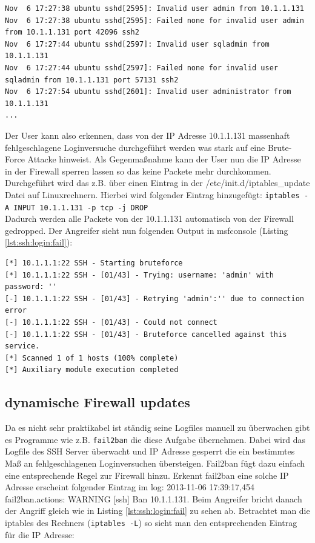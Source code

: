 \documentclass[a4paper,12pt]{article} %
\begin{document}
\begin{lstlisting}[style=code,caption={Auth-Log des SSH Server am Ziel},label=lst:ssh:log]
Nov  6 17:27:38 ubuntu sshd[2595]: Invalid user admin from 10.1.1.131
Nov  6 17:27:38 ubuntu sshd[2595]: Failed none for invalid user admin from 10.1.1.131 port 42096 ssh2
Nov  6 17:27:44 ubuntu sshd[2597]: Invalid user sqladmin from 10.1.1.131
Nov  6 17:27:44 ubuntu sshd[2597]: Failed none for invalid user sqladmin from 10.1.1.131 port 57131 ssh2
Nov  6 17:27:54 ubuntu sshd[2601]: Invalid user administrator from 10.1.1.131
...
\end{lstlisting}
Der User kann also erkennen, dass von der IP Adresse 10.1.1.131 massenhaft fehlgeschlagene Loginversuche durchgeführt werden was stark auf eine Brute-Force Attacke hinweist. Als Gegenmaßnahme kann der User nun die IP Adresse in der Firewall sperren lassen so das keine Packete mehr durchkommen. Durchgeführt wird das z.B. über einen Eintrag in der /etc/init.d/iptables\_update Datei auf Linuxrechnern. Hierbei wird folgender Eintrag hinzugefügt: \verb!iptables -A INPUT 10.1.1.131 -p tcp -j DROP! \\
Dadurch werden alle Packete von der 10.1.1.131 automatisch von der Firewall gedropped. Der Angreifer sieht nun folgenden Output in msfconsole (Listing \ref{lst:ssh:login:fail}):
\begin{lstlisting}[style=code,caption={Fehlgeschlagene Brute-Force Attacke},label=lst:ssh:login:fail]
[*] 10.1.1.1:22 SSH - Starting bruteforce
[*] 10.1.1.1:22 SSH - [01/43] - Trying: username: 'admin' with password: ''
[-] 10.1.1.1:22 SSH - [01/43] - Retrying 'admin':'' due to connection error
[-] 10.1.1.1:22 SSH - [01/43] - Could not connect
[-] 10.1.1.1:22 SSH - [01/43] - Bruteforce cancelled against this service.
[*] Scanned 1 of 1 hosts (100% complete)
[*] Auxiliary module execution completed
\end{lstlisting}

\subsection{dynamische Firewall updates}
\label{subsection:dyn:firewall}
Da es nicht sehr praktikabel ist ständig seine Logfiles manuell zu überwachen gibt es Programme wie z.B. \verb!fail2ban! die diese Aufgabe übernehmen. Dabei wird das Logfile des SSH Server überwacht und IP Adresse gesperrt die ein bestimmtes Maß an fehlgeschlagenen Loginversuchen übersteigen. Fail2ban fügt dazu einfach eine entsprechende Regel zur Firewall hinzu. Erkennt fail2ban eine solche IP Adresse erscheint folgender Eintrag im log: 2013-11-06 17:39:17,454 fail2ban.actions: WARNING [ssh] Ban 10.1.1.131. Beim Angreifer bricht danach der Angriff gleich wie in Listing \ref{lst:ssh:login:fail} zu sehen ab. Betrachtet man die iptables des Rechners (\verb!iptables -L!) so sieht man den entsprechenden Eintrag für die IP Adresse:
\end{document}
